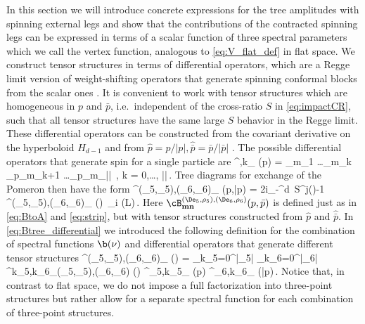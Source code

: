 In this section we will introduce concrete expressions for the tree amplitudes with spinning external legs and show that the contributions of the contracted spinning legs can be expressed in terms of a scalar function of three spectral parameters which we call the vertex function, analogous to \eqref{eq:V_flat_def} in flat space.
We construct tensor structures in terms of differential operators, which are a Regge limit version of weight-shifting operators that generate spinning conformal blocks from the scalar ones \cite{Costa:2011dw,Karateev:2017jgd}. 
It is convenient to work with tensor structures which are homogeneous in $p$ and $\bar{p}$, i.e.\ independent of the cross-ratio $S$ in \eqref{eq:impactCR}, such that all tensor structures have the same large $S$ behavior in the Regge limit. These differential operators can be constructed from the covariant derivative on the hyperboloid $H_{d-1}$ and from $\hat{p}= p/|p|, \hat{\bar{p}}=\bar{p}/|\bar{p}|$ 
\cite{Cornalba:2009ax,Costa:2017twz}.
The possible differential operators that generate spin for a single particle are
	\beq
		^{\rho,k}_{} (p) = 
		_{m_1} \ldots {}_{m_k} {\nabla_{p}}_{m_{k+1}} \ldots {\nabla_{p}}_{m_{|\rho|}} \,, \qquad k = 0,\ldots, |\rho|\,.
		\label{eq:ts_operators}
	\eeq
Tree diagrams for exchange of the Pomeron   then have the form
	\beq
		\cB^{(\De_5,\rho_5),(\De_6,\rho_6)}_{ }  (p,\bar{p}) 
		= 2\pi i\int\limits_{-\infty}^\infty d\nu \, S^{j(\nu)-1} 
		^{(\De_5,\rho_5),(\De_6,\rho_6)}_{ } (\nu)\,
		\Omega_{i \nu} (L)\,.
		\label{eq:Btree_differential}
	\eeq
	Here
$\cB^{(\De_5,\rho_5),(\De_6,\rho_6)}_{\mathbf{m}\mathbf{n}}  (p,\bar{p})$ is defined just as in \eqref{eq:BtoA} and \eqref{eq:strip}, but with tensor structures constructed from $\hat{p}$ and $\hat{\bar{p}}$.
In \eqref{eq:Btree_differential} we introduced the following definition for the combination of spectral functions $\b(\nu)$ and differential operators that generate different tensor structures
	\beq
		^{(\De_5,\rho_5),(\De_6,\rho_6)}_{ } (\nu)
		= \sum\limits_{k_5=0}^{|\rho_5|}  \sum\limits_{k_6=0}^{|\rho_6|} \beta^{k_5,k_6}_{(\De_5,\rho_5),(\De_6,\rho_6)} (\nu)
		 ^{\rho_5,k_5}_{} (p) ^{\rho_6,k_6}_{} (\bar{p})\,.
\label{eq:Dfrak}
	\eeq
Notice that, in contrast to flat space, we do not impose a full factorization into three-point structures but rather allow for a separate spectral function for each combination of three-point structures.	


